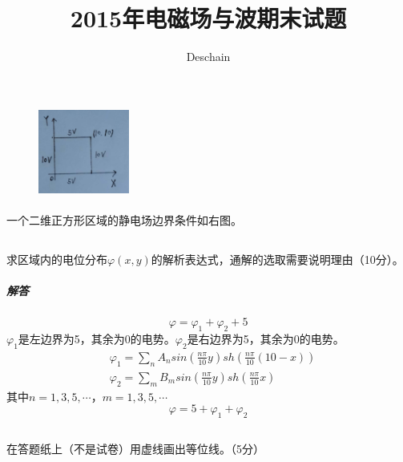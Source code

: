 \documentclass[UTF8]{ctexart}
\title{2015年电磁场与波期末试题}
\author{Deschain}
\begin{document}
\maketitle
\section{}
\begin{figure}
\includegraphics[width=3cm]{2015-1.jpg}
\end{figure}
\paragraph{}
一个二维正方形区域的静电场边界条件如右图。
\subsection{}
\paragraph{}
求区域内的电位分布$\varphi(x,y)$的解析表达式，通解的选取需要说明理由（10分）。
\subparagraph{解答}
\[\varphi=\varphi_1+\varphi_2+5\]
$\varphi_1$是左边界为5，其余为0的电势。$\varphi_2$是右边界为5，其余为0的电势。
\begin{equation*}
\begin{aligned}
&\varphi_1=\sum_n^{}A_nsin(\frac{n\pi}{10}y)sh(\frac{n\pi}{10}(10-x))\\
&\varphi_2=\sum_m^{}B_msin(\frac{n\pi}{10}y)sh(\frac{n\pi}{10}x)
\end{aligned}
\end{equation*}
其中$n=1,3,5,\cdots，m=1,3,5,\cdots$
\[\varphi=5+\varphi_1+\varphi_2\]
\subsection{}
\paragraph{}
在答题纸上（不是试卷）用虚线画出等位线。（5分）
\subsection{}
\end{document}
